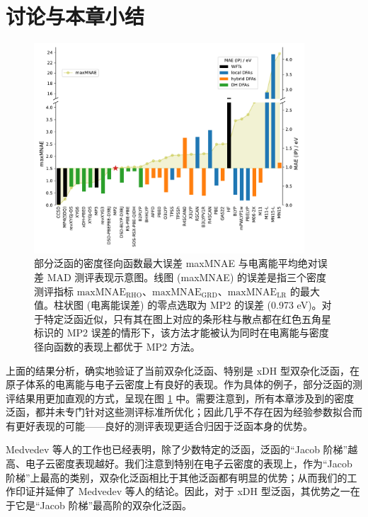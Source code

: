 \section{讨论与本章小结}

\begin{figure}[t]
    \centering
    \includegraphics[width=0.9\textwidth]{assets/compare-err-relative.pdf}
    \caption{部分泛函的密度径向函数最大误差 maxMNAE 与电离能平均绝对误差 MAD 测评表现示意图。线图 (maxMNAE) 的误差是指三个密度测评指标 $\text{maxMNAE}_\text{RHO}$、$\text{maxMNAE}_\text{GRD}$、$\text{maxMNAE}_\text{LR}$ 的最大值。柱状图 (电离能误差) 的零点选取为 MP2 的误差 (0.973 eV)。对于特定泛函近似，只有其在图上对应的条形柱与散点都在红色五角星标识的 MP2 误差的情形下，该方法才能被认为同时在电离能与密度径向函数的表现上都优于 MP2 方法。}
    \label{fig.4.compare-err-relative}
\end{figure}

上面的结果分析，确实地验证了当前双杂化泛函、特别是 xDH 型双杂化泛函，在原子体系的电离能与电子云密度上有良好的表现。作为具体的例子，部分泛函的测评结果用更加直观的方式，呈现在图 \ref{fig.4.compare-err-relative} 中。需要注意到，所有本章涉及到的密度泛函，都并未专门针对这些测评标准所优化；因此几乎不存在因为经验参数拟合而有更好表现的可能——良好的测评表现更适合归因于泛函本身的优势。

Medvedev 等人的工作也已经表明，除了少数特定的泛函，泛函的“Jacob 阶梯”越高、电子云密度表现越好。我们注意到特别在电子云密度的表现上，作为“Jacob 阶梯”上最高的类别，双杂化泛函相比于其他泛函都有明显的优势；从而我们的工作印证并延伸了 Medvedev 等人的结论。因此，对于 xDH 型泛函，其优势之一在于它是“Jacob 阶梯”最高阶的双杂化泛函。

